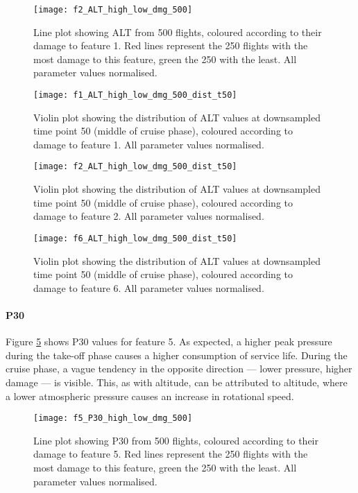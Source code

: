 \begin{figure}
    \centering
    \texttt{[image: f2\_ALT\_high\_low\_dmg\_500]}
    \caption{\label{fig:high_low_dmg_ALT} Line plot showing ALT from 500 flights, coloured according to their damage to feature 1. Red lines represent the 250 flights with the most damage to this feature, green the 250 with the least. All parameter values normalised.}
\end{figure}

\begin{figure}
    \centering
    \texttt{[image: f1\_ALT\_high\_low\_dmg\_500\_dist\_t50]}
    \caption{\label{fig:dmg_violin_ALT_f1} Violin plot showing the distribution of ALT values at downsampled time point 50 (middle of cruise phase), coloured according to damage to feature 1. All parameter values normalised.}
\end{figure}

\begin{figure}
    \centering
    \texttt{[image: f2\_ALT\_high\_low\_dmg\_500\_dist\_t50]}
    \caption{\label{fig:dmg_violin_ALT_f2} Violin plot showing the distribution of ALT values at downsampled time point 50 (middle of cruise phase), coloured according to damage to feature 2. All parameter values normalised.}
\end{figure}

\begin{figure}
    \centering
    \texttt{[image: f6\_ALT\_high\_low\_dmg\_500\_dist\_t50]}
    \caption{\label{fig:dmg_violin_ALT_f6} Violin plot showing the distribution of ALT values at downsampled time point 50 (middle of cruise phase), coloured according to damage to feature 6. All parameter values normalised.}
\end{figure}

\paragraph*{P30}
Figure \ref{fig:high_low_dmg_P30} shows P30 values for feature 5. As expected, a higher peak pressure during the take-off phase causes a higher consumption of service life. During the cruise phase, a vague tendency in the opposite direction --- lower pressure, higher damage --- is visible. This, as with altitude, can be attributed to altitude, where a lower atmospheric pressure causes an increase in rotational speed.

\begin{figure}
    \centering
    \texttt{[image: f5\_P30\_high\_low\_dmg\_500]}
    \caption{\label{fig:high_low_dmg_P30} Line plot showing P30 from 500 flights, coloured according to their damage to feature 5. Red lines represent the 250 flights with the most damage to this feature, green the 250 with the least. All parameter values normalised.}
\end{figure}

